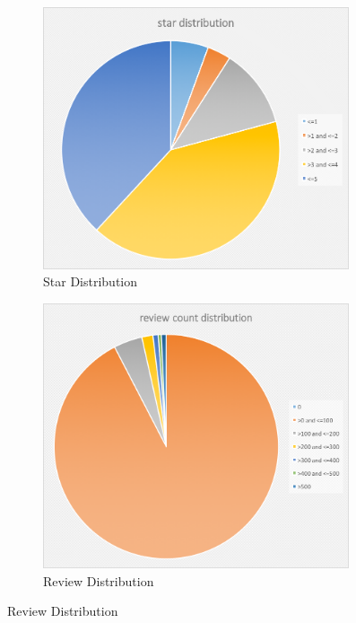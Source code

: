 \documentclass[10pt]{sig-alternate-10pt}   	%
\begin{document}
\begin{figure}[t]
  \centering
  \begin{subfigure} [b]{0.45\textwidth}        
  	  \includegraphics[width=0.99\textwidth]{figures/stars.png}
        \caption{Star Distribution}
        \label{fig:star}
  \end{subfigure}
  \begin{subfigure}[b]{0.45\textwidth}        
        \includegraphics[width=0.99\textwidth]{figures/review.png}
        \caption{Review Distribution}

\end{subfigure}
\end{figure}
\end{document}
